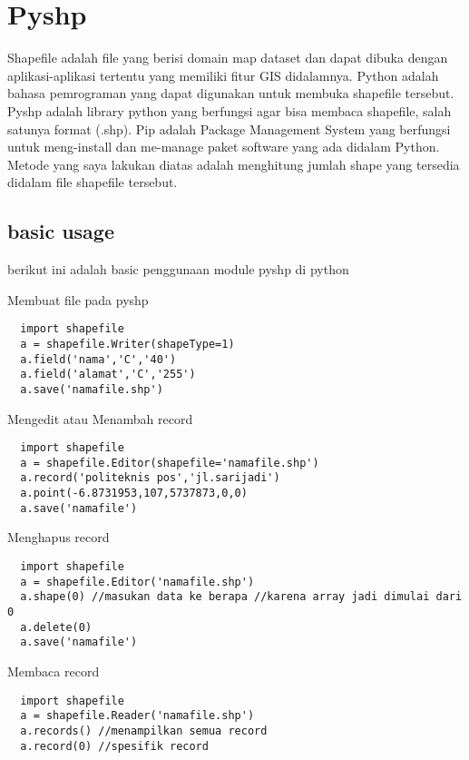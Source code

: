 
\section{Pyshp}
Shapefile adalah file yang berisi domain map dataset dan dapat dibuka dengan aplikasi-aplikasi tertentu yang memiliki fitur GIS didalamnya.
Python adalah bahasa pemrograman yang dapat digunakan untuk membuka shapefile tersebut.
Pyshp adalah library python yang berfungsi agar bisa membaca shapefile, salah satunya format (.shp).
Pip adalah Package Management System yang berfungsi untuk meng-install dan me-manage paket software yang ada didalam Python.
Metode yang saya lakukan diatas adalah menghitung jumlah shape yang tersedia didalam file shapefile tersebut.


\subsection{basic usage}
berikut ini adalah basic penggunaan module pyshp di python

Membuat file pada pyshp
  \begin{verbatim}
  import shapefile
  a = shapefile.Writer(shapeType=1)
  a.field('nama','C','40')
  a.field('alamat','C','255')
  a.save('namafile.shp')
  \end{verbatim}

Mengedit atau Menambah record
\begin{verbatim}
  import shapefile
  a = shapefile.Editor(shapefile='namafile.shp')
  a.record('politeknis pos','jl.sarijadi')
  a.point(-6.8731953,107,5737873,0,0)
  a.save('namafile')
\end{verbatim}

Menghapus record
\begin{verbatim}
  import shapefile
  a = shapefile.Editor('namafile.shp')
  a.shape(0) //masukan data ke berapa //karena array jadi dimulai dari 0
  a.delete(0)
  a.save('namafile')
\end{verbatim}

Membaca record
\begin{verbatim}
  import shapefile
  a = shapefile.Reader('namafile.shp')
  a.records() //menampilkan semua record
  a.record(0) //spesifik record
\end{verbatim}

